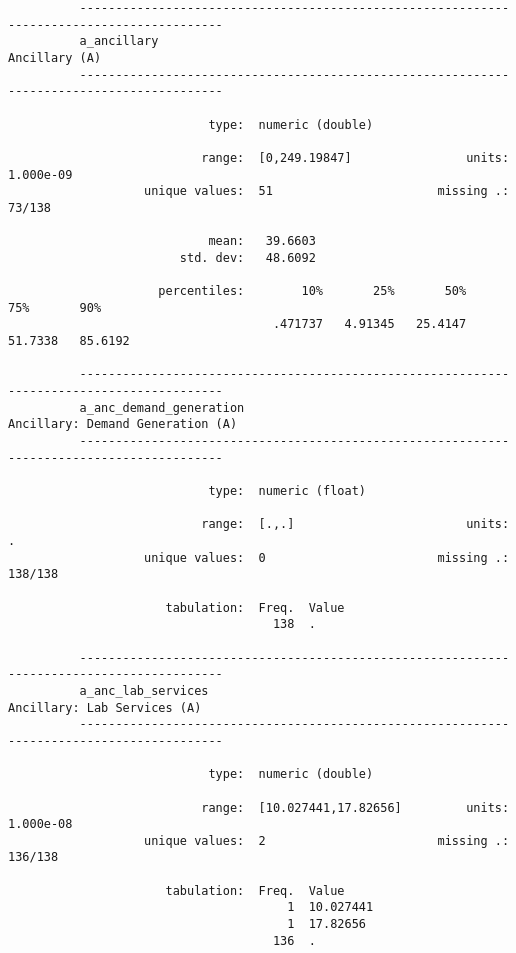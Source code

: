 \documentclass{article}
\begin{document}
\begin{verbatim}
          ------------------------------------------------------------------------------------------
          a_ancillary                                                                  Ancillary (A)
          ------------------------------------------------------------------------------------------
          
                            type:  numeric (double)
          
                           range:  [0,249.19847]                units:  1.000e-09
                   unique values:  51                       missing .:  73/138
          
                            mean:   39.6603
                        std. dev:   48.6092
          
                     percentiles:        10%       25%       50%       75%       90%
                                     .471737   4.91345   25.4147   51.7338   85.6192
          
          ------------------------------------------------------------------------------------------
          a_anc_demand_generation                                   Ancillary: Demand Generation (A)
          ------------------------------------------------------------------------------------------
          
                            type:  numeric (float)
          
                           range:  [.,.]                        units:  .
                   unique values:  0                        missing .:  138/138
          
                      tabulation:  Freq.  Value
                                     138  .
          
          ------------------------------------------------------------------------------------------
          a_anc_lab_services                                             Ancillary: Lab Services (A)
          ------------------------------------------------------------------------------------------
          
                            type:  numeric (double)
          
                           range:  [10.027441,17.82656]         units:  1.000e-08
                   unique values:  2                        missing .:  136/138
          
                      tabulation:  Freq.  Value
                                       1  10.027441
                                       1  17.82656
                                     136  .
          

\end{verbatim}
\end{document}
